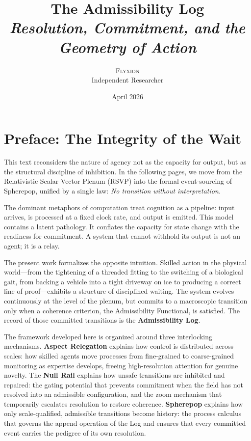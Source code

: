 \documentclass[11pt,oneside]{book}
\title{\Huge \textbf{The Admissibility Log} \\[0.5em]
       \Large \textit{Resolution, Commitment, and the Geometry of Action}}
\author{\textsc{Flyxion} \\ \small Independent Researcher}
\date{April 2026}
\begin{document}
\maketitle
\tableofcontents

\chapter*{Preface: The Integrity of the Wait}

This text reconsiders the nature of agency not as the capacity for output, but as the structural discipline of inhibition. In the following pages, we move from the Relativistic Scalar Vector Plenum (RSVP) into the formal event-sourcing of Spherepop, unified by a single law: \textit{No transition without interpretation.}

The dominant metaphors of computation treat cognition as a pipeline: input arrives, is processed at a fixed clock rate, and output is emitted. This model contains a latent pathology. It conflates the capacity for state change with the readiness for commitment. A system that cannot withhold its output is not an agent; it is a relay.

The present work formalizes the opposite intuition. Skilled action in the physical world---from the tightening of a threaded fitting to the switching of a biological gait, from backing a vehicle into a tight driveway on ice to producing a correct line of proof---exhibits a structure of disciplined waiting. The system evolves continuously at the level of the plenum, but commits to a macroscopic transition only when a coherence criterion, the Admissibility Functional, is satisfied. The record of those committed transitions is the \textbf{Admissibility Log}.

The framework developed here is organized around three interlocking mechanisms. \textbf{Aspect Relegation} explains how control is distributed across scales: how skilled agents move processes from fine-grained to coarse-grained monitoring as expertise develops, freeing high-resolution attention for genuine novelty. The \textbf{Null Rail} explains how unsafe transitions are inhibited and repaired: the gating potential that prevents commitment when the field has not resolved into an admissible configuration, and the zoom mechanism that temporarily escalates resolution to restore coherence. \textbf{Spherepop} explains how only scale-qualified, admissible transitions become history: the process calculus that governs the append operation of the Log and ensures that every committed event carries the pedigree of its own resolution.
\end{document}
